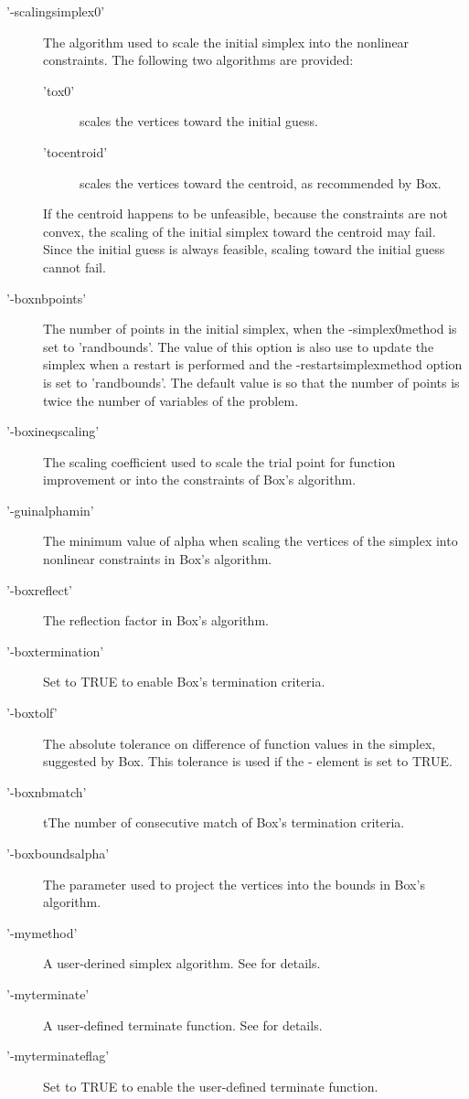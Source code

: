 \begin{Details}
\begin{description}
\begin{description}
\end{description}


\item['-scalingsimplex0'] The algorithm used to scale the initial simplex
into the nonlinear constraints. The following two algorithms are provided:
\begin{description}

\item['tox0'] scales the vertices toward the initial guess.
\item['tocentroid'] scales the vertices toward the centroid, as
recommended by Box.

\end{description}

If the centroid happens to be unfeasible, because the constraints are not
convex, the scaling of the initial simplex toward the centroid may fail.
Since the initial guess is always feasible, scaling toward the initial
guess cannot fail.
\item['-boxnbpoints'] The number of points in the initial simplex, when the
-simplex0method is set to 'randbounds'. The value of this option is also
use to update the simplex when a restart is performed and the
-restartsimplexmethod option is set to 'randbounds'. The default value is
so that the number of points is twice the number of variables of the
problem.
\item['-boxineqscaling'] The scaling coefficient used to scale the trial
point for function improvement or into the constraints of Box's
algorithm.
\item['-guinalphamin'] The minimum value of alpha when scaling the vertices
of the simplex into nonlinear constraints in Box's algorithm.
\item['-boxreflect'] The reflection factor in Box's algorithm.
\item['-boxtermination'] Set to TRUE to enable Box's termination criteria.
\item['-boxtolf'] The absolute tolerance on difference of function values in
the simplex, suggested by Box. This tolerance is used if the
- element is set to TRUE.
\item['-boxnbmatch'] tThe number of consecutive match of Box's termination
criteria.
\item['-boxboundsalpha'] The parameter used to project the vertices into the
bounds in Box's algorithm.
\item['-mymethod'] A user-derined simplex algorithm. See
 for details.
\item['-myterminate'] A user-defined terminate function. See
 for details.
\item['-myterminateflag'] Set to TRUE to enable the user-defined terminate
function.

\end{description}

\end{Details}
